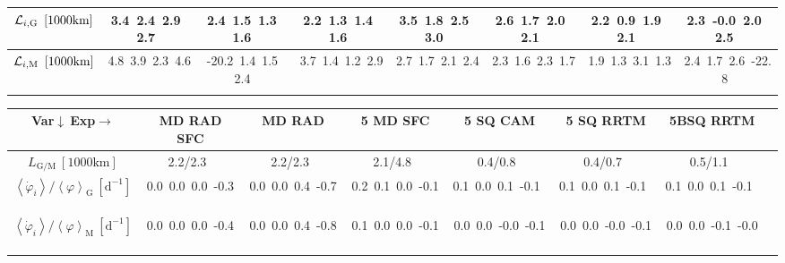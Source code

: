 \begin{table}[H]
{\begin{centering}
\begin{tabular}{|c|c|c|c|c|c|c|c|}
\hline
${\cal L}_{i,\mathrm{G}}\ \left[1000\mathrm{km}\right]$ & \textcolor{C1}{3.4}\ \textcolor{C2}{2.4}\ \textcolor{C3}{2.9}\ \textcolor{C4}{2.7}\  & \textcolor{C1}{2.4}\ \textcolor{C2}{1.5}\ \textcolor{C3}{1.3}\ \textcolor{C4}{1.6}\  & \textcolor{C1}{2.2}\ \textcolor{C2}{1.3}\ \textcolor{C3}{1.4}\ \textcolor{C4}{1.6}\  & \textcolor{C1}{3.5}\ \textcolor{C2}{1.8}\ \textcolor{C3}{2.5}\ \textcolor{C4}{3.0}\  & \textcolor{C1}{2.6}\ \textcolor{C2}{1.7}\ \textcolor{C3}{2.0}\ \textcolor{C4}{2.1}\  & \textcolor{C1}{2.2}\ \textcolor{C2}{0.9}\ \textcolor{C3}{1.9}\ \textcolor{C4}{2.1}\  & \textcolor{C1}{2.3}\ \textcolor{C2}{-0.0}\ \textcolor{C3}{2.0}\ \textcolor{C4}{2.5}\  \tabularnewline
\hline
${\cal L}_{i,\mathrm{M}}\ \left[1000\mathrm{km}\right]$ & \textcolor{C1}{4.8}\ \textcolor{C2}{3.9}\ \textcolor{C3}{2.3}\ \textcolor{C4}{4.6}\  & \textcolor{C1}{-20.2}\ \textcolor{C2}{1.4}\ \textcolor{C3}{1.5}\ \textcolor{C4}{2.4}\  & \textcolor{C1}{3.7}\ \textcolor{C2}{1.4}\ \textcolor{C3}{1.2}\ \textcolor{C4}{2.9}\  & \textcolor{C1}{2.7}\ \textcolor{C2}{1.7}\ \textcolor{C3}{2.1}\ \textcolor{C4}{2.4}\  & \textcolor{C1}{2.3}\ \textcolor{C2}{1.6}\ \textcolor{C3}{2.3}\ \textcolor{C4}{1.7}\  & \textcolor{C1}{1.9}\ \textcolor{C2}{1.3}\ \textcolor{C3}{3.1}\ \textcolor{C4}{1.3}\  & \textcolor{C1}{2.4}\ \textcolor{C2}{1.7}\ \textcolor{C3}{2.6}\ \textcolor{C4}{-22.8}\  \tabularnewline
\hline
 &  &  &  &  &  &  & \tabularnewline
\hline
\end{tabular}
\begin{tabular}{|c|c|c|c|c|c|c|c|}
\hline
Var$\downarrow\ $Exp$\rightarrow$ & MD RAD SFC & MD RAD & 5 MD SFC & 5 SQ CAM & 5 SQ RRTM & 5BSQ RRTM \tabularnewline
\hline
\hline
$L_{\mathrm{G/M}}\ \left[1000\mathrm{km}\right]$ & 2.2/2.3\ & 2.2/2.3\ & 2.1/4.8\ & 0.4/0.8\ & 0.4/0.7\ & 0.5/1.1\ \tabularnewline
\hline
$\left\langle \dot{\varphi}_{i}\right\rangle /\left\langle \varphi\right\rangle _{\mathrm{G}}\ \left[\mathrm{d^{-1}}\right]$ & \textcolor{C1}{0.0}\ \textcolor{C2}{0.0}\ \textcolor{C3}{0.0}\ \textcolor{C4}{-0.3}\  & \textcolor{C1}{0.0}\ \textcolor{C2}{0.0}\ \textcolor{C3}{0.4}\ \textcolor{C4}{-0.7}\  & \textcolor{C1}{0.2}\ \textcolor{C2}{0.1}\ \textcolor{C3}{0.0}\ \textcolor{C4}{-0.1}\  & \textcolor{C1}{0.1}\ \textcolor{C2}{0.0}\ \textcolor{C3}{0.1}\ \textcolor{C4}{-0.1}\  & \textcolor{C1}{0.1}\ \textcolor{C2}{0.0}\ \textcolor{C3}{0.1}\ \textcolor{C4}{-0.1}\  & \textcolor{C1}{0.1}\ \textcolor{C2}{0.0}\ \textcolor{C3}{0.1}\ \textcolor{C4}{-0.1}\  \tabularnewline
\hline
$\left\langle \dot{\varphi}_{i}\right\rangle /\left\langle \varphi\right\rangle _{\mathrm{M}}\ \left[\mathrm{d^{-1}}\right]$ & \textcolor{C1}{0.0}\ \textcolor{C2}{0.0}\ \textcolor{C3}{0.0}\ \textcolor{C4}{-0.4}\  & \textcolor{C1}{0.0}\ \textcolor{C2}{0.0}\ \textcolor{C3}{0.4}\ \textcolor{C4}{-0.8}\  & \textcolor{C1}{0.1}\ \textcolor{C2}{0.0}\ \textcolor{C3}{0.0}\ \textcolor{C4}{-0.1}\  & \textcolor{C1}{0.0}\ \textcolor{C2}{0.0}\ \textcolor{C3}{-0.0}\ \textcolor{C4}{-0.1}\  & \textcolor{C1}{0.0}\ \textcolor{C2}{0.0}\ \textcolor{C3}{-0.0}\ \textcolor{C4}{-0.1}\  & \textcolor{C1}{0.0}\ \textcolor{C2}{0.0}\ \textcolor{C3}{-0.1}\ \textcolor{C4}{-0.0}\  \tabularnewline

\end{tabular}
\end{centering}}
\end{table}
